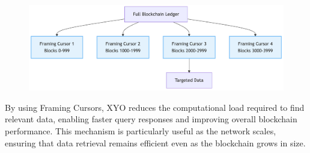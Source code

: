 \documentclass{article}
\begin{document}
\begin{figure}[h]
    \centering
    \includegraphics[width=15cm]{framing-cursor.png}
\end{figure}

By using Framing Cursors, XYO reduces the computational load required to find relevant data, enabling faster query responses and improving overall blockchain performance. This mechanism is particularly useful as the network scales, ensuring that data retrieval remains efficient even as the blockchain grows in size. 
\end{document}
